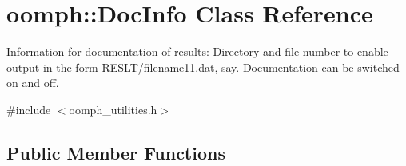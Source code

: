 \hypertarget{classoomph_1_1DocInfo}{}\section{oomph\+:\+:Doc\+Info Class Reference}
\label{classoomph_1_1DocInfo}


Information for documentation of results\+: Directory and file number to enable output in the form R\+E\+S\+L\+T/filename11.\+dat, say. Documentation can be switched on and off.  




{\ttfamily \#include $<$oomph\+\_\+utilities.\+h$>$}

\subsection*{Public Member Functions}
